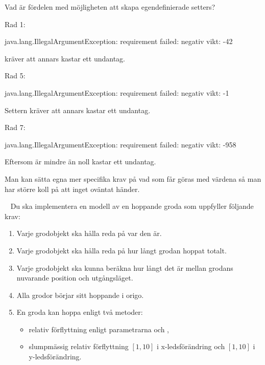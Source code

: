 \Subtask Vad är fördelen med möjligheten att skapa egendefinierade setters?

\SOLUTION


\TaskSolved \what


\SubtaskSolved

Rad 1:
\begin{REPL}
	java.lang.IllegalArgumentException: requirement failed: negativ vikt: -42
\end{REPL}
 kräver att  annars kastar  ett undantag.

Rad 5:
\begin{REPL}
	java.lang.IllegalArgumentException: requirement failed: negativ vikt: -1
\end{REPL}
Settern  kräver att  annars kastar  ett undantag.

Rad 7:
\begin{REPL}
	java.lang.IllegalArgumentException: requirement failed: negativ vikt: -958
\end{REPL}
Eftersom  är mindre än noll kastar  ett undantag.

\SubtaskSolved  Man kan sätta egna mer specifika krav på vad som får göras med värdena så man har större koll på att inget oväntat händer.

\QUESTEND





\QUESTBEGIN

\Task  \what~  Du ska implementera en modell av en hoppande groda som uppfyller följande krav:
\begin{enumerate}%
\item Varje grodobjekt ska hålla reda på var den är.
\item Varje grodobjekt ska hålla reda på hur långt grodan hoppat totalt.
\item Varje grodobjekt ska kunna beräkna hur långt det är mellan grodans nuvarande position och utgångsläget.
\item Alla grodor börjar sitt hoppande i origo.
\item En groda kan hoppa enligt två metoder:
  \begin{itemize} [nolistsep, noitemsep]
  \item relativ förflyttning enligt parametrarna  och ,
  \item slumpmässig relativ förflyttning $[1, 10]$ i x-ledsförändring och $[1, 10]$ i y-ledsförändring.
  \end{itemize}
\end{enumerate}


